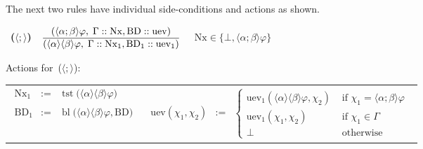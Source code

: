 \documentclass{entcs}
\newcommand{\pea}[2]{\langle#1\rangle #2}
\newcommand{\psp}[2]{#1;#2}
\newcommand{\tnode}[3]{(#1 :: #2 :: #3)}
\newcommand{\tnext}{\mathrm{Nx}}
\newcommand{\tbdia}{\mathrm{BD}}
\newcommand{\tuev}{\mathrm{uev}}
\newcommand{\tres}{$\pea{\psp{}{}}{}$}
\newcommand{\tfean}{\mathop{\mathrm{tst}}}
\newcommand{\tbl}{\mathop{\mathrm{bl}}}
\newcommand{\ds}{\displaystyle\strut}
\newcommand{\ruleone}[3]{
\mbox{ {\bf #1} \ $\frac{\ds \mbox{$#2$}}{\ds \mbox{$#3$}}$}}
\begin{document}
The next two rules have individual side-conditions and actions as shown.
\begin{center}
  \ruleone{(\tres{})}
  {\tnode{\pea{\psp{\alpha}{\beta}}{\varphi} , \; \Gamma}{\tnext, \tbdia}{\tuev}}
  {\tnode{\pea{\alpha}{\pea{\beta}{\varphi}} , \; \Gamma}{\tnext_1, \tbdia_1}{\tuev_1}}
  $\quad\tnext \in \{ \bot, \pea{\psp{\alpha}{\beta}}{\varphi} \}$
\end{center}
\begin{flushleft}
  Actions for~(\tres{}): \ \\
  \begin{tabular}[c]{lr}
    \begin{minipage}[l]{0.28\linewidth}
      \begin{eqnarray*}
        \tnext_1 & := & \tfean\big( \pea{\alpha}{\pea{\beta}{\varphi}} \big)
        \\ \\
        \tbdia_1 & := & \tbl\big( \pea{\alpha}{\pea{\beta}{\varphi}}, \tbdia \big)
      \end{eqnarray*}
    \end{minipage}
    &
    \begin{minipage}[l]{0.72\linewidth}
      \begin{eqnarray*}
        \tuev(\chi_1, \chi_2) & := &
        \left\{
          \begin{array}{ll}
            \tuev_1(\pea{\alpha}{\pea{\beta}{\varphi}}, \chi_2) & \text{ if } \chi_1 = \pea{\psp{\alpha}{\beta}}{\varphi}\\
            \tuev_1(\chi_1, \chi_2) & \text{ if } \chi_1 \in \Gamma\\
            \bot & \text{ otherwise}
          \end{array}
        \right .
      \end{eqnarray*}
    \end{minipage}
  \end{tabular}
\end{flushleft}
\end{document}
